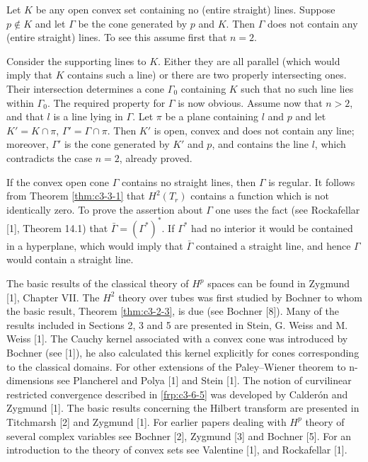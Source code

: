  Let $K$ be any open convex set containing no (entire straight) lines. Suppose $p \notin K$ and let $\Gamma$ be the cone generated by $p$ and $K$. Then $\Gamma$ does not contain any (entire straight) lines. To see this assume first that $n = 2$.

Consider the supporting lines to $K$. Either they are all parallel (which would imply that $K$ contains such a line) or there are two properly intersecting ones. Their intersection determines a cone $\Gamma_0$ containing $K$ such that no such line lies within $\Gamma_0$. The required property for $\Gamma$ is now obvious. Assume now that $n > 2$, and that $l$ is a line lying in $\Gamma$. Let $\pi$ be a plane containing $l$ and $p$ and let $K' = K \cap \pi$, $\Gamma' = \Gamma \cap \pi$. Then $K'$ is open, convex and does not contain any line; moreover, $\Gamma'$ is the cone generated by $K'$ and $p$, and contains the line $l$, which contradicts the case $n = 2$, already proved.

 If the convex open cone $\Gamma$ contains no straight lines, then $\Gamma$ is regular. It follows from Theorem \ref{thm:c3-3-1} that $H^2(T_r)$ contains a function which is not identically zero. To prove the assertion about $\Gamma$ one uses the fact (see Rockafellar [1], Theorem 14.1) that $\bar{\Gamma} = (\Gamma^*)^*$. If $\Gamma^*$ had no interior it would be contained in a hyperplane, which would imply that $\bar{\Gamma}$ contained a straight line, and hence $\Gamma$ would contain a straight line.

\bibnoteshead

The basic results of the classical theory of $H^{p}$ spaces can be found in Zygmund [1], Chapter VII. The $H^{2}$ theory over tubes was first studied by Bochner to whom the basic result, Theorem \ref{thm:c3-2-3}, is due (see Bochner [8]). Many of the results included in Sections 2, 3 and 5 are presented in Stein, G. Weiss and M. Weiss [1]. The Cauchy kernel associated with a convex cone was introduced by Bochner (see [1]), he also calculated this kernel explicitly for cones corresponding to the classical domains. For other extensions of the Paley--Wiener theorem to n-dimensions see Plancherel and Polya [1] and Stein [1]. The notion of curvilinear restricted convergence described in \eqref{frp:c3-6-5} was developed by Calderón and Zygmund [1]. The basic results concerning the Hilbert transform are presented in Titchmarsh [2] and Zygmund [1]. For earlier papers dealing with $H^{p}$ theory of several complex variables see Bochner [2], Zygmund [3] and Bochner [5]. For an introduction to the theory of convex sets see Valentine [1], and Rockafellar [1].


